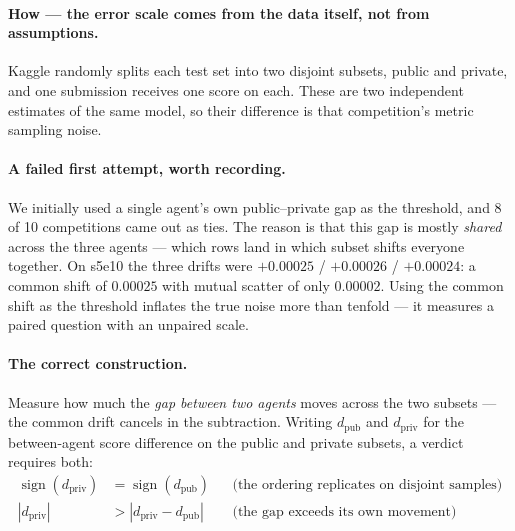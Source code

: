 \documentclass[11pt,a4paper]{article}
\begin{document}
\paragraph{How --- the error scale comes from the data itself, not from assumptions.} Kaggle randomly splits each test set into two disjoint subsets, public and private, and one submission receives one score on each. These are two independent estimates of the same model, so their difference is that competition's metric sampling noise.

\paragraph{A failed first attempt, worth recording.} We initially used a single agent's own public--private gap as the threshold, and 8 of 10 competitions came out as ties. The reason is that this gap is mostly \emph{shared} across the three agents --- which rows land in which subset shifts everyone together. On s5e10 the three drifts were $+0.00025$ / $+0.00026$ / $+0.00024$: a common shift of $0.00025$ with mutual scatter of only $0.00002$. Using the common shift as the threshold inflates the true noise more than tenfold --- it measures a paired question with an unpaired scale.

\paragraph{The correct construction.} Measure how much the \emph{gap between two agents} moves across the two subsets --- the common drift cancels in the subtraction. Writing $d_{\mathrm{pub}}$ and $d_{\mathrm{priv}}$ for the between-agent score difference on the public and private subsets, a verdict requires both:
\begin{align}
\operatorname{sign}(d_{\mathrm{priv}}) &= \operatorname{sign}(d_{\mathrm{pub}})
  && \text{(the ordering replicates on disjoint samples)} \\
|d_{\mathrm{priv}}| &> |d_{\mathrm{priv}} - d_{\mathrm{pub}}|
  && \text{(the gap exceeds its own movement)}
\end{align}
\end{document}
